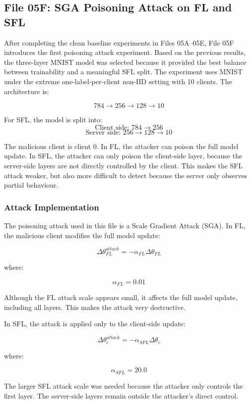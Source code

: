 \subsection*{File 05F: SGA Poisoning Attack on FL and SFL}

After completing the clean baseline experiments in Files 05A--05E, File 05F introduces the first poisoning attack experiment. Based on the previous results, the three-layer MNIST model was selected because it provided the best balance between trainability and a meaningful SFL split. The experiment uses MNIST under the extreme one-label-per-client non-IID setting with 10 clients. The architecture is:

\[
784 \rightarrow 256 \rightarrow 128 \rightarrow 10
\]

For SFL, the model is split into:
\[
\text{Client side: } 784 \rightarrow 256
\]
\[
\text{Server side: } 256 \rightarrow 128 \rightarrow 10
\]

The malicious client is client 0. In FL, the attacker can poison the full model update. In SFL, the attacker can only poison the client-side layer, because the server-side layers are not directly controlled by the client. This makes the SFL attack weaker, but also more difficult to detect because the server only observes partial behaviour.

\subsubsection*{Attack Implementation}

The poisoning attack used in this file is a Scale Gradient Attack (SGA). In FL, the malicious client modifies the full model update:

\[
\Delta \theta^{attack}_{FL}
=
-\alpha_{FL} \Delta \theta_{FL}
\]

where:

\[
\alpha_{FL} = 0.01
\]

Although the FL attack scale appears small, it affects the full model update, including all layers. This makes the attack very destructive.

In SFL, the attack is applied only to the client-side update:

\[
\Delta \theta^{attack}_{c}
=
-\alpha_{SFL} \Delta \theta_{c}
\]

where:

\[
\alpha_{SFL} = 20.0
\]

The larger SFL attack scale was needed because the attacker only controls the first layer. The server-side layers remain outside the attacker’s direct control.


